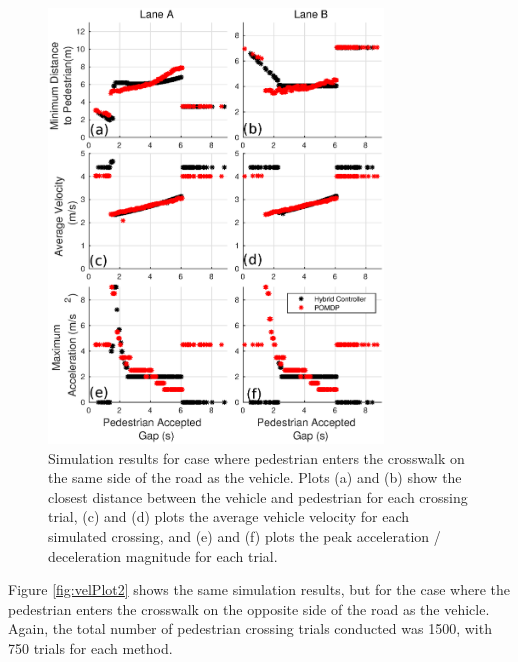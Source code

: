 \documentclass[letterpaper, 10 pt, conference]{ieeeconf}  %
\begin{document}
\begin{figure}
\centering
\includegraphics[width=3.5in]{figures/velPlotBoth.eps}
\caption{Simulation results for case where pedestrian enters the crosswalk on the same side of the road as the vehicle. Plots (a) and (b) show the closest distance between the vehicle and pedestrian for each crossing trial, (c) and (d) plots the average vehicle velocity for each simulated crossing, and (e) and (f) plots the peak acceleration / deceleration magnitude for each trial.}
\label{fig:velPlot1}
\end{figure}

Figure \ref{fig:velPlot2} shows the same simulation results, but for the case where the pedestrian enters the crosswalk on the opposite side of the road as the vehicle. Again, the total number of pedestrian crossing trials conducted was 1500, with 750 trials for each method.  
\end{document}
